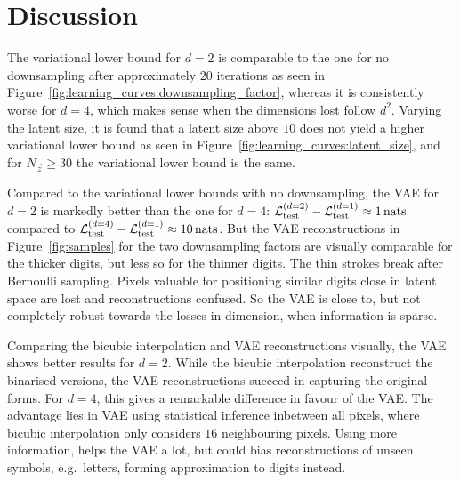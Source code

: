 \section{Discussion}
\label{sec:discussion}

The variational lower bound for $d = 2$ is comparable to the one for no downsampling after approximately $20$ iterations as seen in Figure~\ref{fig:learning_curves:downsampling_factor}, whereas it is consistently worse for $d = 4$, which makes sense when the dimensions lost follow $d^2$.
Varying the latent size, it is found that a latent size above $10$ does not yield a higher variational lower bound as seen in Figure~\ref{fig:learning_curves:latent_size}, and for $N_{\vec{z}} \geq 30$ the variational lower bound is the same.

Compared to the variational lower bounds with no downsampling, the VAE for $d = 2$ is markedly better than the one for $d = 4$: $\mathcal{L}_{\text{test}}^{(d = 2)} - \mathcal{L}_{\text{test}}^{(d = 1)} \approx \SI{1}{nats}$ compared to $\mathcal{L}_{\text{test}}^{(d = 4)} - \mathcal{L}_{\text{test}}^{(d = 1)} \approx \SI{10}{nats}$.
But the VAE reconstructions in Figure~\ref{fig:samples} for the two downsampling factors are visually comparable for the thicker digits, but less so for the thinner digits. The thin strokes break after Bernoulli sampling. Pixels valuable for positioning similar digits close in latent space are lost and reconstructions confused.  
So the VAE is close to, but not completely robust towards the losses in dimension, when information is sparse. 

Comparing the bicubic interpolation and VAE reconstructions visually, the VAE shows better results for $d = 2$.
While the bicubic interpolation reconstruct the binarised versions, the VAE reconstructions succeed in capturing the original forms.
For $d = 4$, this gives a remarkable difference in favour of the VAE.
The advantage lies in VAE using statistical inference inbetween all pixels, where bicubic interpolation only considers $16$ neighbouring pixels. Using more information, helps the VAE a lot, but could bias reconstructions of unseen symbols, e.g.\ letters, forming approximation to digits instead.
